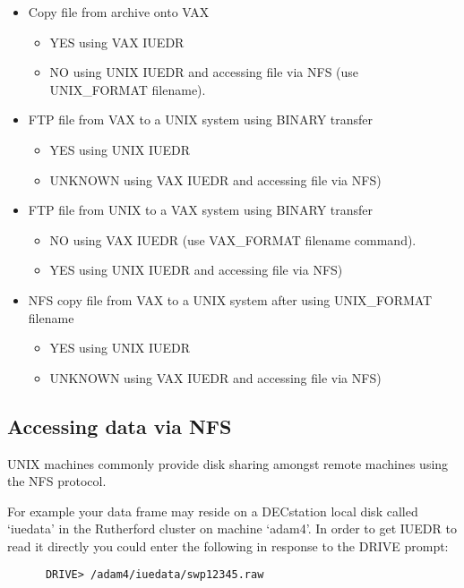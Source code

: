 \begin{itemize}
\item
Copy file from archive onto VAX
\begin{itemize}
\item{YES using VAX IUEDR}
\item{NO using UNIX IUEDR and accessing file via NFS (use UNIX\_FORMAT filename).}
\end{itemize}

\item
FTP file from VAX to a UNIX system using BINARY transfer
\begin{itemize}
\item{YES using UNIX IUEDR}
\item{UNKNOWN using VAX IUEDR and accessing file via NFS)}
\end{itemize}

\item
FTP file from UNIX to a VAX system using BINARY transfer
\begin{itemize}
\item{NO using VAX IUEDR (use VAX\_FORMAT filename command).}
\item{YES using UNIX IUEDR and accessing file via NFS)}
\end{itemize}

\item
NFS copy file from VAX to a UNIX system after using UNIX\_FORMAT filename
\begin{itemize}
\item{YES using UNIX IUEDR}
\item{UNKNOWN using VAX IUEDR and accessing file via NFS)}
\end{itemize}

\end{itemize}

\subsection{Accessing data via NFS}

UNIX machines commonly provide disk sharing amongst remote machines
using the NFS protocol. 

For example your data frame may reside on a DECstation local  disk
called `iuedata' in the Rutherford cluster on machine `adam4'. In
order to get IUEDR to read it directly you could enter the following
in response to the DRIVE prompt:

\begin{verbatim}
      DRIVE> /adam4/iuedata/swp12345.raw
\end{verbatim}

